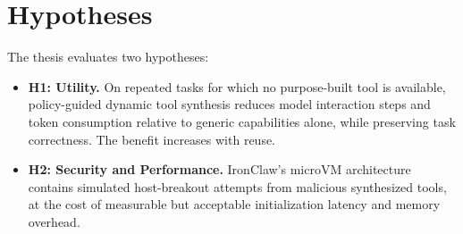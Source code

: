 \section{Hypotheses}
The thesis evaluates two hypotheses:
\begin{itemize}
    \item \textbf{H1: Utility.} On repeated tasks for which no purpose-built
    tool is available, policy-guided dynamic tool synthesis reduces model
    interaction steps and token consumption relative to generic capabilities
    alone, while preserving task correctness. The benefit increases with reuse.
    \item \textbf{H2: Security and Performance.} IronClaw's microVM architecture
    contains simulated host-breakout attempts from malicious synthesized tools,
    at the cost of measurable but acceptable initialization latency and memory
    overhead.
\end{itemize}
